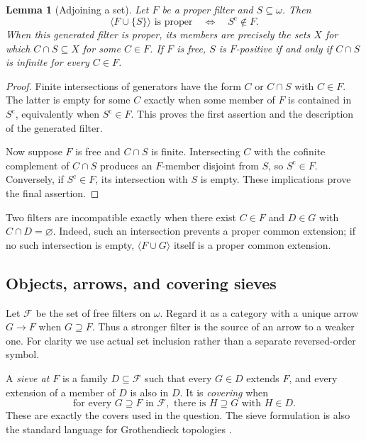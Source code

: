 \documentclass[11pt,letterpaper]{article}
\newtheorem{lemma}[theorem]{Lemma}
\theoremstyle{definition}
\theoremstyle{remark}
\newcommand{\om}{\omega}
\newcommand{\cF}{\mathcal F}
\newcommand{\gen}[1]{\langle #1\rangle}
\newcommand{\co}{\mathrm c}
\begin{document}
\begin{lemma}[Adjoining a set]\label{lem:positive}
Let $F$ be a proper filter and $S\subseteq\om$. Then
\[
 \gen{F\cup\{S\}}\text{ is proper}\quad\Longleftrightarrow\quad S^\co\notin F.
\]
When this generated filter is proper, its members are precisely the sets
$X$ for which $C\cap S\subseteq X$ for some $C\in F$. If $F$ is free,
$S$ is $F$-positive if and only if $C\cap S$ is infinite for every $C\in F$.
\end{lemma}
\begin{proof}
Finite intersections of generators have the form $C$ or $C\cap S$ with
$C\in F$. The latter is empty for some $C$ exactly when some member of
$F$ is contained in $S^\co$, equivalently when $S^\co\in F$. This proves
the first assertion and the description of the generated filter.

Now suppose $F$ is free and $C\cap S$ is finite. Intersecting $C$ with
the cofinite complement of $C\cap S$ produces an $F$-member disjoint
from $S$, so $S^\co\in F$. Conversely, if $S^\co\in F$, its intersection
with $S$ is empty. These implications prove the final assertion.
\end{proof}

Two filters are incompatible exactly when there exist $C\in F$ and
$D\in G$ with $C\cap D=\varnothing$. Indeed, such an intersection
prevents a proper common extension; if no such intersection is empty,
$\gen{F\cup G}$ itself is a proper common extension.

\subsection{Objects, arrows, and covering sieves}
Let $\cF$ be the set of free filters on $\om$. Regard it as a category
with a unique arrow $G\to F$ when $G\supseteq F$. Thus a stronger filter
is the source of an arrow to a weaker one. For clarity we use actual set
inclusion rather than a separate reversed-order symbol.

A \emph{sieve at $F$} is a family $D\subseteq\cF$ such that every
$G\in D$ extends $F$, and every extension of a member of $D$ is also
in $D$. It is \emph{covering} when
\begin{equation}\label{eq:density}
 \text{for every }G\supseteq F\text{ in }\cF,
 \text{ there is }H\supseteq G\text{ with }H\in D.
\end{equation}
These are exactly the covers used in the question. The sieve formulation
is also the standard language for Grothendieck topologies
\cite[Section 7.48]{StacksTopology}.
\end{document}
